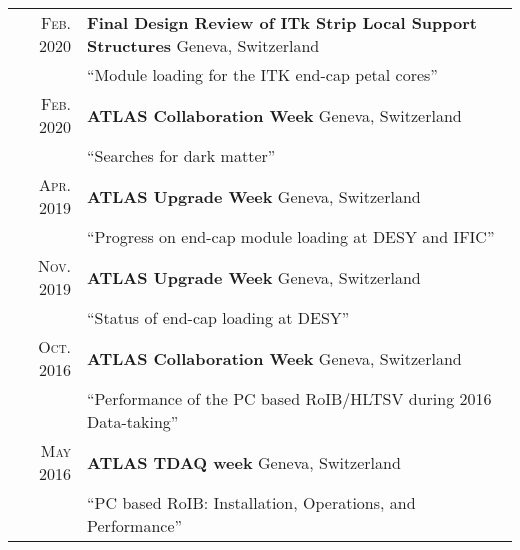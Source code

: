 \documentclass[a4paper,10pt]{article}
\begin{document}
\begin{tabular}{rp{15.5cm}}
\textsc{Feb. 2020}		& {\bf Final Design Review of ITk Strip Local Support Structures} \hfill Geneva, Switzerland\\
						& ``Module loading for the ITK end-cap petal cores''  	\\
\textsc{Feb. 2020}		& {\bf ATLAS Collaboration Week} \hfill Geneva, Switzerland\\
						& ``Searches for dark matter''  	\\
\textsc{Apr. 2019}		& {\bf ATLAS Upgrade Week} \hfill Geneva, Switzerland\\
						& ``Progress on end-cap module loading at DESY and IFIC''  	\\
\textsc{Nov. 2019}		& {\bf ATLAS Upgrade Week} \hfill Geneva, Switzerland\\
						& ``Status of end-cap loading at DESY''  	\\
\textsc{Oct. 2016}		& {\bf ATLAS Collaboration Week} \hfill Geneva, Switzerland\\
						& ``Performance of the PC based RoIB/HLTSV during 2016 Data-taking''  	\\
\textsc{May 2016}		& {\bf ATLAS TDAQ week} \hfill Geneva, Switzerland\\
						& ``PC based RoIB: Installation, Operations, and Performance''  	\\
\end{tabular}
\end{document}
